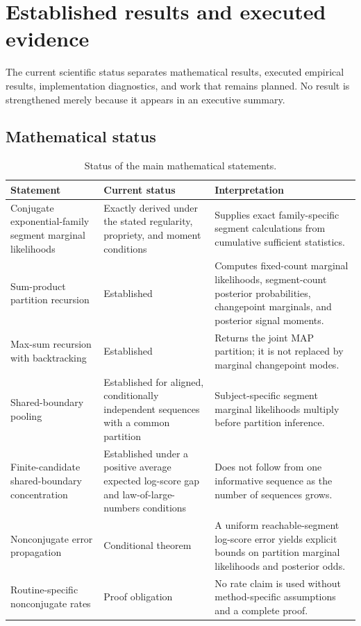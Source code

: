 \section{Established results and executed evidence}
\label{sec:exec-evidence}

The current scientific status separates mathematical results, executed empirical results, implementation diagnostics, and work that remains planned. No result is strengthened merely because it appears in an executive summary.

\subsection{Mathematical status}

\begin{table}[H]
\centering
\small
\begin{tabularx}{0.96\textwidth}{@{}p{}p{}X@{}}
\toprule
\textbf{Statement} & \textbf{Current status} & \textbf{Interpretation} \\
\midrule
Conjugate exponential-family segment marginal likelihoods & Exactly derived under the stated regularity, propriety, and moment conditions & Supplies exact family-specific segment calculations from cumulative sufficient statistics. \\
Sum-product partition recursion & Established & Computes fixed-count marginal likelihoods, segment-count posterior probabilities, changepoint marginals, and posterior signal moments. \\
Max-sum recursion with backtracking & Established & Returns the joint MAP partition; it is not replaced by marginal changepoint modes. \\
Shared-boundary pooling & Established for aligned, conditionally independent sequences with a common partition & Subject-specific segment marginal likelihoods multiply before partition inference. \\
Finite-candidate shared-boundary concentration & Established under a positive average expected log-score gap and law-of-large-numbers conditions & Does not follow from one informative sequence as the number of sequences grows. \\
Nonconjugate error propagation & Conditional theorem & A uniform reachable-segment log-score error yields explicit bounds on partition marginal likelihoods and posterior odds. \\
Routine-specific nonconjugate rates & Proof obligation & No rate claim is used without method-specific assumptions and a complete proof. \\
\bottomrule
\end{tabularx}
\caption{Status of the main mathematical statements.}
\label{tab:exec-theory-status}
\end{table}

